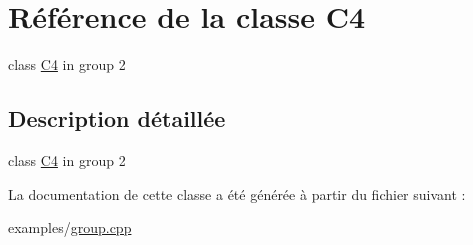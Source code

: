 \hypertarget{class_c4}{}\section{Référence de la classe C4}
\label{class_c4}


class \hyperlink{class_c4}{C4} in group 2  




\subsection{Description détaillée}
class \hyperlink{class_c4}{C4} in group 2 

La documentation de cette classe a été générée à partir du fichier suivant \+:\begin{DoxyCompactItemize}
\item 
examples/\hyperlink{group_8cpp}{group.\+cpp}\end{DoxyCompactItemize}
